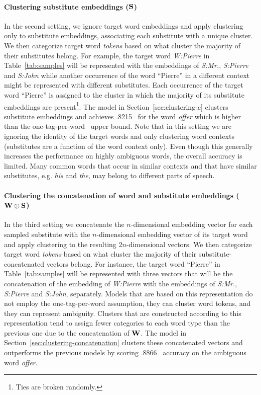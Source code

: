 \paragraph{Clustering substitute embeddings (${\bf S}$)}  In the
second setting, we ignore target word embeddings and apply clustering
only to substitute embeddings, associating each substitute with a
unique cluster.  We then categorize target word {\em tokens} based on
what cluster the majority of their substitutes belong.  For example,
the target word {\it W:Pierre} in Table~\ref{tab:samples} will be
represented with the embeddings of {\it S:Mr.}, {\it S:Pierre} and
{\it S:John} while another occurrence of the word ``Pierre'' in a
different context might be represented with different substitutes.
Each occurrence of the target word ``Pierre'' is assigned to the
cluster in which the majority of its substitute embeddings are
present\footnote{Ties are broken randomly.}.  The model in
Section~\ref{sec:clustering-c} clusters substitute embeddings and
achieves .8215 \mto\ for the word {\em offer} which is higher than the
one-tag-per-word \mto\ upper bound.  Note that in this setting we are
ignoring the identity of the target words and only clustering word
contexts (substitutes are a function of the word context only).  Even
though this generally increases the performance on highly ambiguous
words, the overall accuracy is limited.  Many common words that occur
in similar contexts and that have similar substitutes, e.g. {\em his}
and {\em the}, may belong to different parts of speech.

\paragraph{Clustering the concatenation of word and substitute 
embeddings (${\bf W\oplus S}$)} In the third setting we concatenate
the $n$-dimensional embedding vector for each sampled substitute with
the $n$-dimensional embedding vector of its target word and apply
clustering to the resulting $2n$-dimensional vectors.  We then
categorize target word {\em tokens} based on what cluster the majority
of their substitute-concatenated vectors belong.  For instance, the
target word ``Pierre'' in Table~\ref{tab:samples} will be represented
with three vectors that will be the concatenation of the embedding of
{\it W:Pierre} with the embeddings of {\it S:Mr.}, {\it S:Pierre} and
{\it S:John}, separately.  Models that are based on this
representation do not employ the one-tag-per-word assumption, they can
cluster word tokens, and they can represent ambiguity.  Clusters that
are constructed according to this representation tend to assign fewer
categories to each word type than the previous one due to the
concatenation of ${\bf W}$.  The model in
Section~\ref{sec:clustering-concatenation} clusters these concatenated
vectors and outperforms the previous models by scoring .8866
\mto\ accuracy on the ambiguous word {\em offer}.

